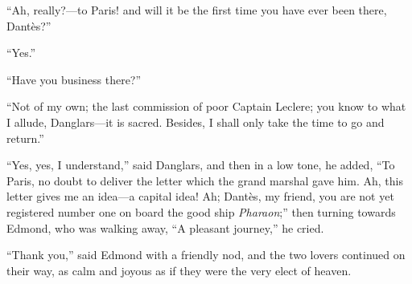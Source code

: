“Ah, really?—to Paris! and will it be the first time you have ever been
there, Dantès?”

“Yes.”

“Have you business there?”

“Not of my own; the last commission of poor Captain Leclere; you know
to what I allude, Danglars—it is sacred. Besides, I shall only take the
time to go and return.”

“Yes, yes, I understand,” said Danglars, and then in a low tone, he
added, “To Paris, no doubt to deliver the letter which the grand
marshal gave him. Ah, this letter gives me an idea—a capital idea! Ah;
Dantès, my friend, you are not yet registered number one on board the
good ship \textit{Pharaon};” then turning towards Edmond, who was walking
away, “A pleasant journey,” he cried.

“Thank you,” said Edmond with a friendly nod, and the two lovers
continued on their way, as calm and joyous as if they were the very
elect of heaven.
